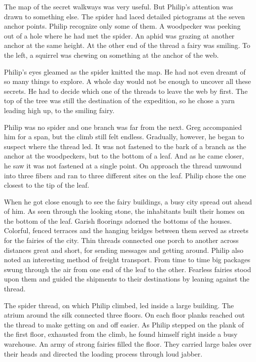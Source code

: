 \documentclass[10pt, draft]{memoir}
\begin{document}
The map of the secret walkways was very useful. But Philip's attention was drawn to something else. The spider had laced detailed pictograms at the seven anchor points. Philip recognize only some of them. A woodpecker was peeking out of a hole where he had met the spider. An aphid was grazing at another anchor at the same height. At the other end of the thread a fairy was smiling. To the left, a squirrel was chewing on something at the anchor of the web.

Philip's eyes gleamed as the spider knitted the map. He had not even dreamt of so many things to explore. A whole day would not be enough to uncover all these secrets. He had to decide which one of the threads to leave the web by first. The top of the tree was still the destination of the expedition, so he chose a yarn leading high up, to the smiling fairy.

Philip was no spider and one branch was far from the next. Greg accompanied him for a span, but the climb still felt endless. Gradually, however, he began to suspect where the thread led. It was not fastened to the bark of a branch as the anchor at the woodpeckers, but to the bottom of a leaf. And as he came closer, he saw it was not fastened at a single point. On approach the thread unwound into three fibers and ran to three different sites on the leaf. Philip chose the one closest to the tip of the leaf.

When he got close enough to see the fairy buildings, a busy city spread out ahead of him. As seen through the looking stone, the inhabitants built their homes on the bottom of the leaf. Garish floorings adorned the bottoms of the houses. Colorful, fenced terraces and the hanging bridges between them served as streets for the fairies of the city. Thin threads connected one porch to another across distances great and short, for sending messages and getting around. Philip also noted an interesting method of freight transport. From time to time big packages swung through the air from one end of the leaf to the other. Fearless fairies stood upon them and guided the shipments to their destinations by leaning against the thread.

The spider thread, on which Philip climbed, led inside a large building. The atrium around the silk connected three floors. On each floor planks reached out the thread to make getting on and off easier. As Philip stepped on the plank of the first floor, exhausted from the climb, he found himself right inside a busy warehouse. An army of strong fairies filled the floor. They carried large bales over their heads and directed the loading process through loud jabber.
\end{document}
